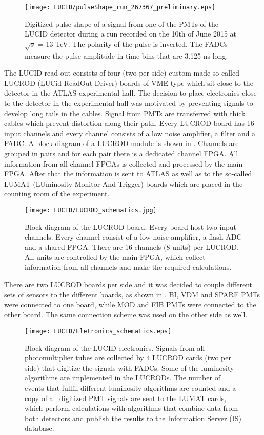 \begin{figure}
\centering
\texttt{[image: LUCID/pulseShape\_run\_267367\_preliminary.eps]}
\caption{Digitized pulse shape of a signal from one of the PMTs of the LUCID detector during a run recorded on 
the 10th of June 2015 at $\sqrt{s}$ = 13 TeV. The polarity of the pulse is inverted. The FADCs measure the 
pulse amplitude in time bins that are 3.125 ns long.}
\label{fig:pulseShape}
\end{figure}

The LUCID read-out consists of four (two per side) custom made so-called LUCROD (LUCid ReadOut Driver) boards of VME type which sit close to the detector in the ATLAS experimental hall.
The decision to place electronics close to the detector in the experimental hall was motivated by preventing signals to develop long tails in the cables.
Signal from PMTs are transferred with thick cables which prevent distortion along their path.
Every LUCROD board has 16 input channels and every channel consists of a low noise amplifier, a filter and a FADC.
A block diagram of a LUCROD module is shown in .
Channels are grouped in pairs and for each pair there is a dedicated channel FPGA.
All information from all channel FPGAs is collected and processed by the main FPGA.
After that the information is sent to ATLAS as well as to the so-called LUMAT (LUminosity Monitor And Trigger) boards 
which are placed in the counting room of the experiment.

\begin{figure}
\centering
\texttt{[image: LUCID/LUCROD\_schematics.jpg]}
\caption{Block diagram of the LUCROD board. Every board host two input channels. Every channel consist of a low noise amplifier, a flash ADC and a shared FPGA. 
There are 16 channels (8 units) per LUCROD. All units are controlled by the main FPGA, which collect information from all channels and make the required calculations.}
\label{fig:LUCROD_schematics}
\end{figure}

There are two LUCROD boards per side and it was decided to couple different sets of sensors to the different boards, as shown in 
.
BI, VDM and SPARE PMTs were connected to one board, while MOD and FIB PMTs were connected to the other board.
The same connection scheme was used on the other side as well.

\begin{figure}
\centering
\texttt{[image: LUCID/Eletronics\_schematics.eps]}
\caption{Block diagram of the LUCID electronics. Signals from all photomultiplier tubes are collected by 4 \mbox{LUCROD} cards 
(two per side) that digitize the signals with FADCs. Some of the luminosity algorithms are implemented in the LUCRODs. 
The number of events that fullfil different luminosity algorithms are counted and a copy of all digitized PMT 
signals are sent to the LUMAT cards, which perform calculations with algorithms that combine data from 
both detectors and publish the results to the Information Server (IS) database.}
\label{fig:Eletronics_schematics}
\end{figure}

